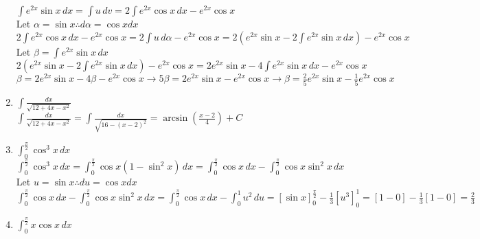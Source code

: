 \documentclass[10pt, letterpaper]{report}
\begin{document}
\begin{enumerate}
    $\int{e^{2x}\sin{x}}\,dx=
    \int{u}\,dv=
    2\int{e^{2x}\cos{x}}\,dx-e^{2x}\cos{x}$ \\
    
    Let $\alpha=\sin{x}\therefore d\alpha=\cos{x}dx$ \\
    
    $2\int{e^{2x}\cos{x}}\,dx-e^{2x}\cos{x}=
    2\int{u}\,d\alpha-e^{2x}\cos{x}=
    2\left(e^{2x}\sin{x}-2\int{e^{2x}\sin{x}}\,dx\right)-e^{2x}\cos{x}$ \\
    
    Let $\beta=\int{e^{2x}\sin{x}}\,dx$ \\
    
    $2\left(e^{2x}\sin{x}-2\int{e^{2x}\sin{x}}\,dx\right)-e^{2x}\cos{x}=
    2e^{2x}\sin{x}-4\int{e^{2x}\sin{x}}\,dx-e^{2x}\cos{x}$ \\
    
    $\beta=2e^{2x}\sin{x}-4\beta-e^{2x}\cos{x}\rightarrow
    5\beta=2e^{2x}\sin{x}-e^{2x}\cos{x}\rightarrow
    \beta=\frac{2}{5}e^{2x}\sin{x}-\frac{1}{5}e^{2x}\cos{x}$
    
  \item{$\int{\frac{dx}{\sqrt{12+4x-x^{2}}}}$} \\
  
    $\int{\frac{dx}{\sqrt{12+4x-x^{2}}}}=
    \int{\frac{dx}{\sqrt{16-(x-2)^{2}}}}=
    \arcsin{\left(\frac{x-2}{4}\right)}+C$ \\
    
  \item{$\int_{0}^{\frac{\pi}{2}}{\cos^{3}{x}}\,dx$} \\
  
    $\int_{0}^{\frac{\pi}{2}}{\cos^{3}{x}}\,dx=
    \int_{0}^{\frac{\pi}{2}}{\cos{x}}\left(1-\sin^{2}{x}\right)\,dx=
    \int_{0}^{\frac{\pi}{2}}{\cos{x}}\,dx-\int_{0}^{\frac{\pi}{2}}{\cos{x}\sin^{2}{x}}\,dx$ \\
    
    Let $u=\sin{x}\therefore du=\cos{x}dx$ \\
    
    $\int_{0}^{\frac{\pi}{2}}{\cos{x}}\,dx-\int_{0}^{\frac{\pi}{2}}{\cos{x}\sin^{2}{x}}\,dx=
    \int_{0}^{\frac{\pi}{2}}{\cos{x}}\,dx-\int_{0}^{1}{u^{2}}\,du=
    [\sin{x}]_{0}^{\frac{\pi}{2}}-\frac{1}{3}[u^{3}]_{0}^{1}=
    [1-0]-\frac{1}{3}[1-0]=\frac{2}{3}$ \\
    
  \item{$\int_{0}^{\frac{\pi}{2}}{x\cos{x}}\,dx$} \\
  

\end{enumerate}
\end{document}
